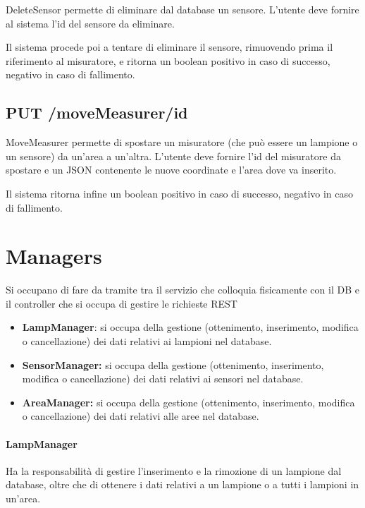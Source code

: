 DeleteSensor permette di eliminare dal database un sensore. L'utente deve fornire al sistema l'id del sensore da eliminare.

Il sistema procede poi a tentare di eliminare il sensore, rimuovendo prima il riferimento al misuratore, e ritorna un boolean positivo in caso di successo, negativo in caso di fallimento.

\subsection { PUT /moveMeasurer/id}

MoveMeasurer permette di spostare un misuratore (che può essere un lampione o un sensore) da un'area a un'altra. L'utente deve fornire l'id del misuratore da spostare e un JSON contenente le nuove coordinate e l'area dove va inserito.

Il sistema ritorna infine un boolean positivo in caso di successo, negativo in caso di fallimento.

\section{Managers}

Si occupano di fare da tramite tra il servizio che colloquia fisicamente con il DB e il controller che si occupa di gestire le richieste REST

\begin{itemize}
    \item \textbf{LampManager}: si occupa della gestione (ottenimento, inserimento, modifica o cancellazione) dei dati relativi ai lampioni nel database.
    \item \textbf{SensorManager:} si occupa della gestione (ottenimento, inserimento, modifica o cancellazione) dei dati relativi ai sensori nel database. 
    \item \textbf{AreaManager:} si occupa della gestione (ottenimento, inserimento, modifica o cancellazione) dei dati relativi alle aree nel database.
\end{itemize}

\paragraph{LampManager}

Ha la responsabilità di gestire l'inserimento e la rimozione di un lampione dal database, oltre che di ottenere i dati relativi a un lampione o a tutti i lampioni in un'area.

